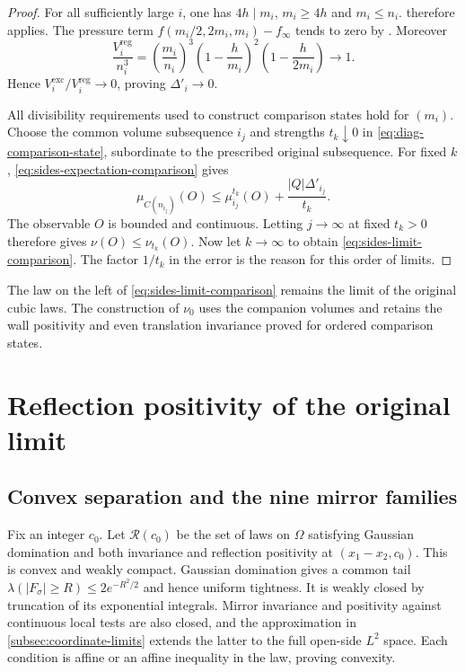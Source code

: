 \documentclass[11pt,letterpaper,reqno]{amsart}
\begin{document}
\begin{proof}
For all sufficiently large $i$, one has $4h\mid m_i$, $m_i\ge4h$
and $m_i\le n_i$.  therefore
applies. The pressure term $f(m_i/2,2m_i,m_i)-f_\infty$ tends
to zero by . Moreover
\begin{equation}\label{eq:sides-volume-ratio}
 \frac{V_i^{\mathrm{reg}}}{n_i^3}
 =\left(\frac{m_i}{n_i}\right)^3
    \left(1-\frac h{m_i}\right)^2
    \left(1-\frac h{2m_i}\right)\longrightarrow1.
\end{equation}
Hence $V_i^{\mathrm{exc}}/V_i^{\mathrm{reg}}\to0$, proving
$\Delta'_i\to0$.

All divisibility requirements used to construct comparison states
hold for $(m_i)$. Choose the common volume subsequence $i_j$ and
strengths $t_k\downarrow0$ in \eqref{eq:diag-comparison-state},
subordinate to the prescribed original subsequence. For fixed $k$,
\eqref{eq:sides-expectation-comparison} gives
\[
 \mu_{C(n_{i_j})}(O)\le\mu_{i_j}^{t_k}(O)
                         +\frac{|Q|\Delta'_{i_j}}{t_k}.
\]
The observable $O$ is bounded and continuous. Letting $j\to\infty$
at fixed $t_k>0$ therefore gives $\nu(O)\le\nu_{t_k}(O)$.
Now let $k\to\infty$ to obtain \eqref{eq:sides-limit-comparison}.
The factor $1/t_k$ in the error is the reason for this order of limits.
\end{proof}

The law on the left of \eqref{eq:sides-limit-comparison} remains the
limit of the original cubic laws. The construction of $\nu_0$ uses
the companion volumes and retains the wall positivity and even
translation invariance proved for ordered comparison states.
\section{Reflection positivity of the original limit}\label{sec:completion}

\subsection{Convex separation and the nine mirror families}\label{subsec:diag-separation}

Fix an integer $c_0$. Let $\mathcal R(c_0)$ be the set of
laws on $\Omega$ satisfying Gaussian domination and both
invariance and reflection positivity at
$(x_1-x_2,c_0)$. This is convex and weakly compact. Gaussian
domination gives a common tail
$\lambda(|F_\sigma|\ge R)\le2e^{-R^2/2}$ and hence uniform
tightness. It is weakly closed by truncation of its exponential
integrals. Mirror invariance and positivity against continuous
local tests are also closed, and the approximation in \cref{subsec:coordinate-limits}
extends the latter to the full open-side $L^2$ space. Each condition is affine
or an affine inequality in the law, proving convexity.
\end{document}
